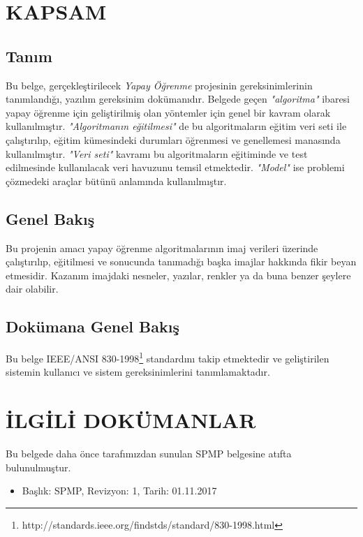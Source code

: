 \documentclass[12pt,a4paper]{article}
\begin{document}
   
   \newpage

   \tableofcontents
   \newpage


   \section{KAPSAM}
   \subsection{Tanım} \label{kaps}
   Bu belge, gerçekleştirilecek \textit{Yapay Öğrenme} projesinin gereksinimlerinin tanımlandığı, yazılım gereksinim dokümanıdır. Belgede geçen \textit{"algoritma"} ibaresi yapay öğrenme için geliştirilmiş olan yöntemler için genel bir kavram olarak kullanılmıştır. \textit{"Algoritmanın eğitilmesi"} de bu algoritmaların eğitim veri seti ile çalıştırılıp, eğitim kümesindeki durumları öğrenmesi ve genellemesi manasında kullanılmıştır. \textit{"Veri seti"} kavramı bu algoritmaların eğitiminde ve test edilmesinde kullanılacak veri havuzunu temsil etmektedir. \textit{"Model"} ise problemi çözmedeki araçlar bütünü anlamında kullanılmıştır.

   \subsection{Genel Bakış} \label{genel}
   Bu projenin amacı yapay öğrenme algoritmalarının imaj verileri üzerinde çalıştırılıp, eğitilmesi ve sonucunda tanımadığı başka imajlar hakkında fikir beyan etmesidir. Kazanım imajdaki nesneler, yazılar, renkler ya da buna benzer şeylere dair olabilir.

   \subsection{Dokümana Genel Bakış}
   Bu belge IEEE/ANSI 830-1998\footnote{http://standards.ieee.org/findstds/standard/830-1998.html} standardını takip etmektedir ve geliştirilen sistemin kullanıcı ve sistem gereksinimlerini tanımlamaktadır.

   \section{İLGİLİ DOKÜMANLAR}
   Bu belgede daha önce tarafımızdan sunulan SPMP belgesine atıfta bulunulmuştur.
   \begin{itemize}
      \item Başlık: SPMP, Revizyon: 1, Tarih: 01.11.2017
   \end{itemize}
\end{document}
